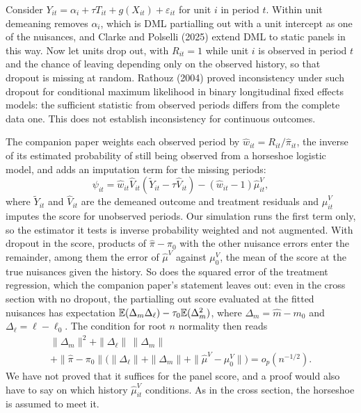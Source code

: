 Consider $Y_{it} = \alpha_i + \tau T_{it} + g(X_{it}) + \varepsilon_{it}$ for unit $i$ in period $t$. Within unit demeaning removes $\alpha_i$, which is DML partialling out with a unit intercept as one of the nuisances, and Clarke and Polselli (2025) extend DML to static panels in this way. Now let units drop out, with $R_{it} = 1$ while unit $i$ is observed in period $t$ and the chance of leaving depending only on the observed history, so that dropout is missing at random. Rathouz (2004) proved inconsistency under such dropout for conditional maximum likelihood in binary longitudinal fixed effects models: the sufficient statistic from observed periods differs from the complete data one. This does not establish inconsistency for continuous outcomes.

The companion paper weights each observed period by $\hat w_{it} = R_{it}/\hat\pi_{it}$, the inverse of its estimated probability of still being observed from a horseshoe logistic model, and adds an imputation term for the missing periods:
\[
\psi_{it} = \hat w_{it}\hat V_{it}(\tilde Y_{it} - \tau\hat V_{it}) - (\hat w_{it} - 1)\hat\mu^{V}_{it},
\]
where $\tilde Y_{it}$ and $\hat V_{it}$ are the demeaned outcome and treatment residuals and $\hat\mu^{V}_{it}$ imputes the score for unobserved periods. Our simulation runs the first term only, so the estimator it tests is inverse probability weighted and not augmented. With dropout in the score, products of $\hat\pi - \pi_0$ with the other nuisance errors enter the remainder, among them the error of $\hat\mu^{V}$ against $\mu^{V}_0$, the mean of the score at the true nuisances given the history. So does the squared error of the treatment regression, which the companion paper's statement leaves out: even in the cross section with no dropout, the partialling out score evaluated at the fitted nuisances has expectation $\mathbb{E}(\Delta_m\Delta_\ell) - \tau_0\mathbb{E}(\Delta_m^2)$, where $\Delta_m = \hat m - m_0$ and $\Delta_\ell = \hat\ell - \ell_0$. The condition for root $n$ normality then reads
\begin{multline*}
\|\Delta_m\|^2 + \|\Delta_\ell\|\,\|\Delta_m\| \\
+ \|\hat\pi - \pi_0\|\bigl(\|\Delta_\ell\| + \|\Delta_m\| + \|\hat\mu^{V} - \mu^{V}_0\|\bigr) = o_p(n^{-1/2}).
\end{multline*}
We have not proved that it suffices for the panel score, and a proof would also have to say on which history $\hat\mu^{V}_{it}$ conditions. As in the cross section, the horseshoe is assumed to meet it.

